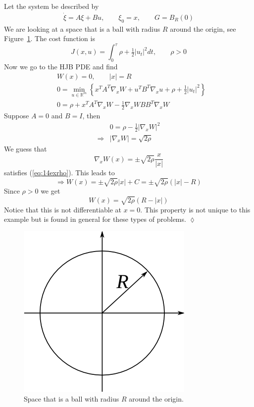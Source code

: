 \begin{example}
\label{ex:14exit}
Let the system be described by
\begin{align*}
\dot{\xi} = A\xi+Bu, \qquad \xi_0 = x, \qquad G=B_R(0)
\end{align*}
We are looking at a space that is a ball with radius $R$ around the origin, see Figure~\ref{fig:14circle}.
The cost function is
$$J(x,u) = \int_0^\tau \rho + \tfrac{1}{2}|u_t|^2dt, \qquad \rho>0$$
Now we go to the HJB PDE and find
\begin{align*}
&W(x) = 0, \qquad |x|=R \\
&0 = \min_{u\in\mathbb{R}^m} \left\lbrace x^T A^T\nabla_x W + u^T B^T \nabla_x u + \rho + \tfrac{1}{2}|u_t|^2 \right\rbrace \\
&0 = \rho + x^T A^T \nabla_x W - \tfrac{1}{2}\nabla_x WBB^T \nabla_x W
\end{align*}
Suppose $A=0$ and $B=I$, then
\begin{align}
\label{eq:14exrho}
&0 = \rho - \tfrac{1}{2}|\nabla_x W|^2 \nonumber \\
\Rightarrow &|\nabla_x W| = \sqrt{2\rho}
\end{align}
We guess that
$$\nabla_x W(x) = \pm \sqrt{2\rho}\frac{x}{|x|}$$
satisfies (\ref{eq:14exrho}).
This leads to
$$\Rightarrow W(x) = \pm\sqrt{2\rho}|x|+C = \pm\sqrt{2\rho}(|x|-R)$$
Since $\rho>0$ we get
$$W(x) = \sqrt{2\rho}(R-|x|)$$
Notice that this is not differentiable at $x=0$.
This property is not unique to this example but is found in general for these types of problems.
$\lozenge$
\end{example}

\begin{figure}[ht!]
\centering
\includegraphics[width=.4\textwidth]{images/14circle}
\caption{Space that is a ball with radius $R$ around the origin.}
\label{fig:14circle}
\end{figure}%

